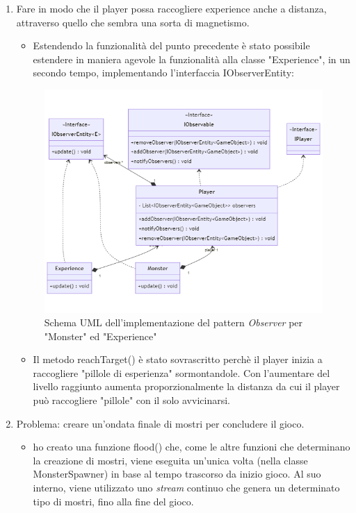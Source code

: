 \documentclass[a4paper,12pt]{report}
\begin{document}
\begin{enumerate}
\item Fare in modo che il player possa raccogliere experience anche a distanza, attraverso quello che sembra una sorta di magnetismo.
\begin{itemize}
	\item Estendendo la funzionalità del punto precedente è stato possibile estendere in maniera agevole la funzionalità alla classe "Experience", in un secondo tempo, implementando l'interfaccia IObserverEntity:
\end{itemize}
\begin{figure}[H]
	\centering{}
\includegraphics[width=\textwidth]{img/monsterObserver2Mermaid.png}
	\caption{Schema UML dell'implementazione del pattern \emph{Observer} per "Monster" ed "Experience"}
\label{img:Observer Pattern}
\end{figure}
%
\begin{itemize}
	\item Il metodo reachTarget() è stato sovrascritto perchè il player inizia a raccogliere "pillole di esperienza" sormontandole. Con l'aumentare del livello raggiunto aumenta proporzionalmente la distanza da cui il player può raccogliere "pillole" con il solo avvicinarsi.
\end{itemize}
%
\item Problema: creare un'ondata finale di mostri per concludere il gioco.
\begin{itemize}
	\item ho creato una funzione flood() che, come le altre funzioni che determinano la creazione di mostri, viene eseguita un'unica volta (nella classe MonsterSpawner) in base al tempo trascorso da inizio gioco. Al suo interno, viene utilizzato uno \emph{stream} continuo che genera un determinato tipo di mostri, fino alla fine del gioco. 

\end{itemize}
\end{enumerate}
\end{document}
